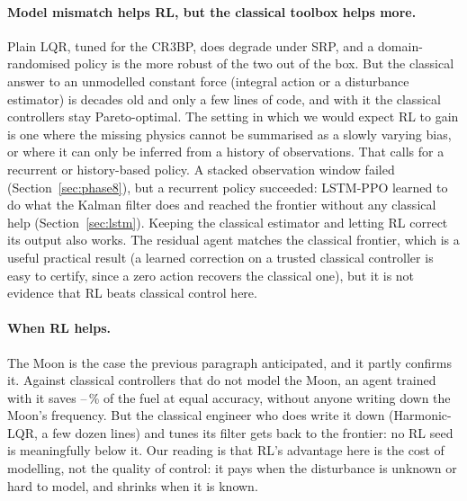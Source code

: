 \documentclass[11pt,a4paper]{article}
\begin{document}
\paragraph{Model mismatch helps RL, but the classical toolbox helps more.}
Plain LQR, tuned for the CR3BP, does degrade under SRP, and a domain-randomised
policy is the more robust of the two out of the box. But the classical answer
to an unmodelled constant force (integral action or a disturbance estimator)
is decades old and only a few lines of code, and with it the classical
controllers stay Pareto-optimal. The setting in which we would expect RL to
gain is one where the missing physics cannot be summarised as a slowly
varying bias, or where it can only be inferred from a history of
observations. That calls for a recurrent or history-based policy. A stacked observation
window failed (Section~\ref{sec:phase8}), but a recurrent policy succeeded:
LSTM-PPO learned to do what the Kalman filter does and reached the frontier
without any classical help (Section~\ref{sec:lstm}). Keeping the classical
estimator and letting RL correct its output also works. The residual agent matches the
classical frontier, which is a useful practical result (a learned correction
on a trusted classical controller is easy to certify, since a zero action
recovers the classical one), but it is not evidence that RL beats classical
control here.

\paragraph{When RL helps.} The Moon is the case the previous paragraph
anticipated, and it partly confirms it. Against classical controllers that do
not model the Moon, an agent trained with it saves
\kThreeAgnSaveMin--\kThreeAgnSaveMax\,\% of the fuel at
equal accuracy, without anyone writing down the Moon's frequency. But the
classical engineer who does write it down (Harmonic-LQR, a few dozen lines)
and tunes its filter gets back to the frontier: no RL seed is meaningfully
below it. Our reading is that RL's advantage here is the cost of
modelling, not the quality of control: it pays when the disturbance is
unknown or hard to model, and shrinks when it is known.
\end{document}
